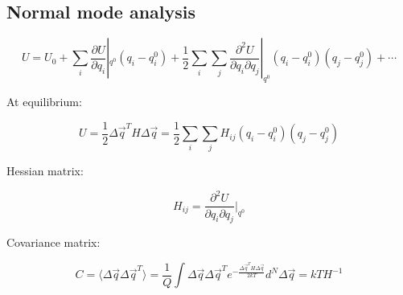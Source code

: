 	\subsection{Normal mode analysis}

	$$U = U_0 + \sum\limits_i\frac{\partial U}{\partial q_i}|_{q^0}(q_i-q_i^0) + \frac{1}{2}\sum\limits_i\sum\limits_j\frac{\partial^2 U}{\partial q_i\partial q_j}|_{q^0}(q_i-q_i^0)(q_j-q_j^0) + \cdots$$

	At equilibrium:

	$$U = \frac{1}{2}\Delta\vec{q}^TH\Delta\vec{q} = \frac{1}{2}\sum\limits_i\sum\limits_j H_{ij}(q_i-q_i^0)(q_j-q_j^0)$$

	Hessian matrix:

	$$H_{ij} = \frac{\partial^2 U}{\partial q_i\partial q_j}|_{q^0}$$

	Covariance matrix:

	$$C = \langle\Delta\vec{q}\Delta\vec{q}^T\rangle = \frac{1}{Q}\int\Delta\vec{q}\Delta\vec{q}^Te^{-\frac{\Delta\vec{q}^TH\Delta\vec{q}}{2kT}}d^N\Delta\vec{q} = kTH^{-1}$$
